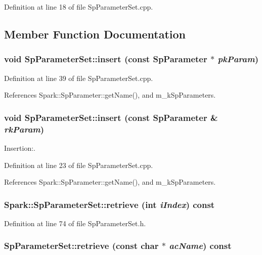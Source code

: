 Definition at line 18 of file Sp\-Parameter\-Set.cpp.

\subsection{Member Function Documentation}
\subsubsection{\setlength{\rightskip}{0pt plus 5cm}void Sp\-Parameter\-Set::insert (const {\bf Sp\-Parameter} $\ast$ {\em pk\-Param})}\label{classSpark_1_1SpParameterSet_a4}


Definition at line 39 of file Sp\-Parameter\-Set.cpp.

References Spark::Sp\-Parameter::get\-Name(), and m\_\-k\-Sp\-Parameters.
\subsubsection{\setlength{\rightskip}{0pt plus 5cm}void Sp\-Parameter\-Set::insert (const {\bf Sp\-Parameter} \& {\em rk\-Param})}\label{classSpark_1_1SpParameterSet_a3}


Insertion:. 

Definition at line 23 of file Sp\-Parameter\-Set.cpp.

References Spark::Sp\-Parameter::get\-Name(), and m\_\-k\-Sp\-Parameters.
\subsubsection{ Spark::Sp\-Parameter\-Set::retrieve (int {\em i\-Index}) const\hspace{0.3cm}{\tt  [inline]}}\label{classSpark_1_1SpParameterSet_a6}


Definition at line 74 of file Sp\-Parameter\-Set.h.
\subsubsection{ Sp\-Parameter\-Set::retrieve (const char $\ast$ {\em ac\-Name}) const}\label{classSpark_1_1SpParameterSet_a5}


